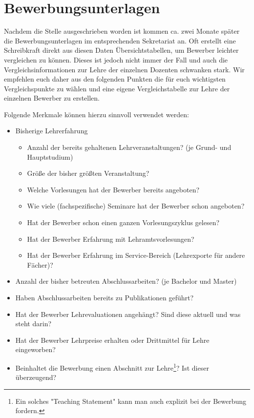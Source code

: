 \section{Bewerbungsunterlagen}\thispagestyle{fancy}
Nachdem die Stelle ausgeschrieben worden ist kommen ca. zwei Monate später die Bewerbungsunterlagen im entsprechenden Sekretariat an. Oft erstellt eine Schreibkraft direkt aus diesen Daten Übersichtstabellen, um Bewerber leichter vergleichen zu können. Dieses ist jedoch nicht immer der Fall und auch die Vergleichsinformationen zur Lehre der einzelnen Dozenten schwanken stark. Wir empfehlen euch daher aus den folgenden Punkten die für euch wichtigsten Vergleichspunkte zu wählen und eine eigene Vergleichstabelle zur Lehre der einzelnen Bewerber zu erstellen.

Folgende Merkmale können hierzu sinnvoll verwendet werden:
\begin{itemize}
    \item Bisherige Lehrerfahrung
    \begin{itemize}
        \item Anzahl der bereits gehaltenen Lehrveranstaltungen? (je Grund- und Hauptstudium)
        \item Größe der bisher größten Veranstaltung?
        \item Welche Vorlesungen hat der Bewerber bereits angeboten?
        \item Wie viele (fachspezifische) Seminare hat der Bewerber schon angeboten?
        \item Hat der Bewerber schon einen ganzen Vorlesungszyklus gelesen?
        \item Hat der Bewerber Erfahrung mit Lehramtsvorlesungen?
        \item Hat der Bewerber Erfahrung im Service-Bereich (Lehrexporte für andere Fächer)?    
    \end{itemize}
    \item Anzahl der bisher betreuten Abschlussarbeiten? (je Bachelor und Master)
    \item Haben Abschlussarbeiten bereits zu Publikationen geführt?
    \item Hat der Bewerber Lehrevaluationen angehängt? Sind diese aktuell und was steht darin? 
    \item Hat der Bewerber Lehrpreise erhalten oder Drittmittel für Lehre eingeworben?
    \item Beinhaltet die Bewerbung einen Abschnitt zur Lehre\footnote{Ein solches "Teaching Statement" kann man auch explizit bei der Bewerbung fordern.}? Ist dieser überzeugend?
\end{itemize}

